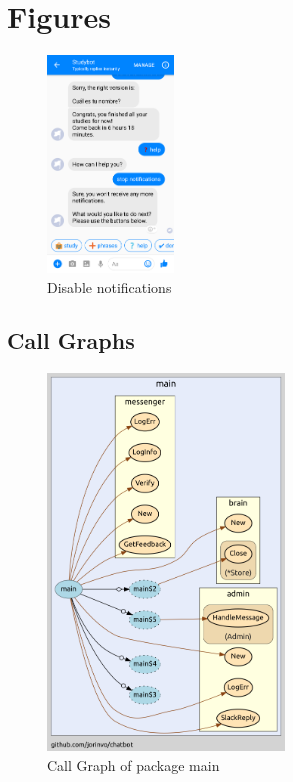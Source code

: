 \appendix

\chapter{Figures}


\begin{figure}[h]
  \centering
  \includegraphics[width=0.3\textwidth]{images/interface/10-disable-notify.png}
	\caption{Disable notifications}
	\label{fig:10-disable-notify}
\end{figure}


\section{Call Graphs}

\begin{figure}[h]
  \centering
  \includegraphics[height=10cm]{images/call-graph-main.png}
	\caption{Call Graph of package main}
  \label{a:call-graph}
\end{figure}

